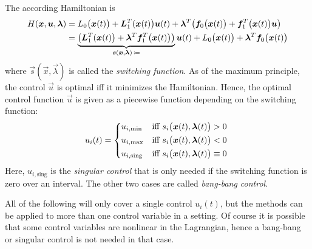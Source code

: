 		The according Hamiltonian is
		\begin{align*}
			H(\bm{x}, \bm{u}, \bm{\lambda})
				&= L_0\big(\bm{x}(t)\big) + \bm{L}_1^T(\bm{x}(t)\big) \bm{u}(t) + \bm{\lambda}^T \big( \bm{f}_0\big(\bm{x}(t)\big) + \bm{f}_1^T\big(\bm{x}(t)\big) \bm{u} \big) \\
				&= \underbrace{\big( \bm{L}_1^T(\bm{x}(t)\big) + \bm{\lambda}^T \bm{f}_1^T\big(\bm{x}(t)\big) \big)}_{\bm{s}(\bm{x}, \bm{\lambda}) \,\coloneqq} \bm{u}(t) + L_0\big(\bm{x}(t)\big) + \bm{\lambda}^T \bm{f}_0\big(\bm{x}(t)\big)
		\end{align*}
		where \( \vec{s}(\vec{x}, \vec{\lambda}) \) is called the \emph{switching function}. As of the maximum principle, the control \(\vec{u}\) is optimal iff it minimizes the Hamiltonian. Hence, the optimal control function \(\vec{u}\) is given as a piecewise function depending on the switching function:
		\begin{align*}
			u_i(t) =
				\begin{cases*}
					u_{i, \mathrm{min}}  & iff \( s_i\big(\vec{x}(t), \vec{\lambda}(t)\big) > 0 \) \\
					u_{i, \mathrm{max}}  & iff \( s_i\big(\vec{x}(t), \vec{\lambda}(t)\big) < 0 \) \\
					u_{i, \mathrm{sing}} & iff \( s_i\big(\vec{x}(t), \vec{\lambda}(t)\big) \equiv 0 \) \\
				\end{cases*}
		\end{align*}
		Here, \( u_{i, \mathrm{sing}} \) is the \emph{singular control} that is only needed if the switching function is zero over an interval. The other two cases are called \emph{bang-bang control}.

		All of the following will only cover a single control \( u_i(t) \), but the methods can be applied to more than one control variable in a setting. Of course it is possible that some control variables are nonlinear in the Lagrangian, hence a bang-bang or singular control is not needed in that case.

